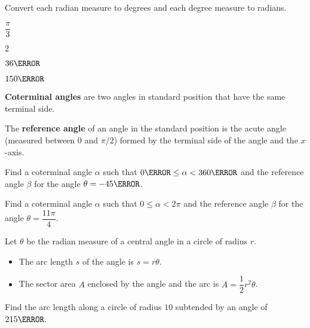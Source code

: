 \begin{example}
  Convert each radian measure to degrees and each degree measure to radians.\\
\begin{enumerate*}
  \item $\dfrac{\pi}{3}$
  \item $2$
  \item $36\degree$
  \item $150\degree$
\end{enumerate*}
\end{example}



\begin{definition}
  \textbf{Coterminal angles} are two angles in standard position that have the same terminal side.

The \textbf{reference angle} of an angle in the standard position is the acute angle (measured between 0 and $\pi/2$) formed by the terminal side of the angle and the $x$-axis.
\end{definition}

\newpage
\begin{example}
  Find a coterminal angle $\alpha$ such that $0\degree\le \alpha<360\degree$ and the reference angle $\beta$ for the angle $\theta=-45\degree$.
\end{example}

\begin{example}
  Find a coterminal angle $\alpha$ such that $0\le \alpha<2\pi$ and the reference angle $\beta$ for the angle $\theta=\dfrac{11\pi}{4}$.
\end{example}


\begin{howto}
  Let $\theta$ be the radian measure of a central angle in a circle of radius $r$.
  \begin{itemize}
    \item The arc length $s$ of the angle is $s=r\theta$.
    \item The sector area $A$ enclosed by the angle and the arc is $A=\dfrac12r^2\theta$.
  \end{itemize}
\end{howto}

\begin{example}
  Find the arc length along a circle of radius $10$ subtended by an angle of $215\degree$.
\end{example}

